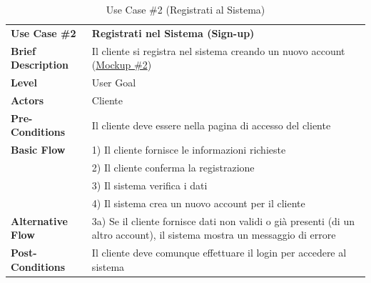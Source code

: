 \documentclass{article}
\begin{document}
\begin{table}[p]
    \begin{tabularx}{\textwidth}{ | l  X | }
        \hline
        \rowcolor{lightgray!70}
        \textbf{Use Case \#2} & \textbf{Registrati nel Sistema (Sign-up)}\\ [0.5ex]
        \textbf{Brief Description} & Il cliente si registra nel sistema creando un nuovo account (\hyperref[fig:mockup_2]{Mockup \#2})\\
        \rowcolor{blue!10}
        \textbf{Level} & User Goal \\
        \textbf{Actors} & Cliente \\
        \rowcolor{blue!10}
        \textbf{Pre-Conditions} & Il cliente deve essere nella pagina di accesso del cliente\\
        \textbf{Basic Flow} & 1) Il cliente fornisce le informazioni richieste\\
        & 2) Il cliente conferma la registrazione\\
        & 3) Il sistema verifica i dati\\
        & 4) Il sistema crea un nuovo account per il cliente\\  
        \rowcolor{blue!10}
        \textbf{Alternative Flow} & 3a) Se il cliente fornisce dati non validi o già presenti (di un altro account), il sistema mostra un messaggio di errore\\
        \textbf{Post-Conditions} & Il cliente deve comunque effettuare il login per accedere al sistema\\
        \hline
    \end{tabularx}
    \caption{Use Case \#2 (Registrati  al Sistema)}
\end{table}
\end{document}
